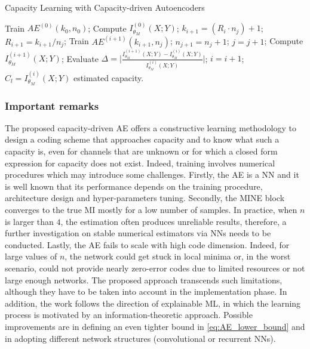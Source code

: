 \begin{algorithm}
\caption{Capacity Learning with Capacity-driven Autoencoders}
\label{alg:autoencoders_1}
\begin{algorithmic}[1]
	\State Train $AE^{(0)}(k_0,n_0)$;
	\State Compute $I^{(0)}_{\theta_M}(X;Y)$;
	\While{$\Delta>\epsilon$}
		\State $k_{i+1} = (R_{i}\cdot n_j) +1$;
		\State $R_{i+1}= k_{i+1}/n_j$;
		\State Train $AE^{(i+1)}(k_{i+1},n_j)$;
			\State $n_{j+1}=n_j+1$;
			\State $j= j +1$;
		\Else
			\State Compute $I^{(i+1)}_{\theta_M}(X;Y)$;
			\State Evaluate $\Delta = \biggl|\frac{I^{(i+1)}_{\theta_M}(X;Y)-I^{(i)}_{\theta_M}(X;Y)}{I^{(i)}_{\theta_M}(X;Y)}\biggr|$;
		\EndIf
		\State $i=i+1$;
	\EndWhile
	\State $C_l = I^{(i)}_{\theta_M}(X;Y)$ estimated capacity.
\EndFor
\end{algorithmic}
\end{algorithm}

\subsubsection{Important remarks}
\label{subsec:autoencoders_remarks}
The proposed capacity-driven AE offers a constructive learning methodology to design a coding scheme that approaches capacity and to know what such a capacity is, even for channels that are unknown or for which a closed form expression for capacity does not exist. Indeed, training involves numerical procedures which may introduce some challenges. Firstly, the AE is a NN and it is well known that its performance depends on the training procedure, architecture design and hyper-parameters tuning. Secondly, the MINE block converges to the true MI mostly for a low number of samples. In practice, when $n$ is larger than $4$, the estimation often produces unreliable results, therefore, a further investigation on stable numerical estimators via NNs needs to be conducted. Lastly, the AE fails to scale with high code dimension. Indeed, for large values of $n$, the network could get stuck in local minima or, in the worst scenario, could not provide nearly zero-error codes due to limited resources or not large enough networks. The proposed approach transcends such limitations, although they have to be taken into account in the implementation phase.
In addition, the work follows the direction of explainable ML, in which the learning process is motivated by an information-theoretic approach.
Possible improvements are in defining an even tighter bound in \eqref{eq:AE_lower_bound} and in adopting different network structures (convolutional or recurrent NNs). 

